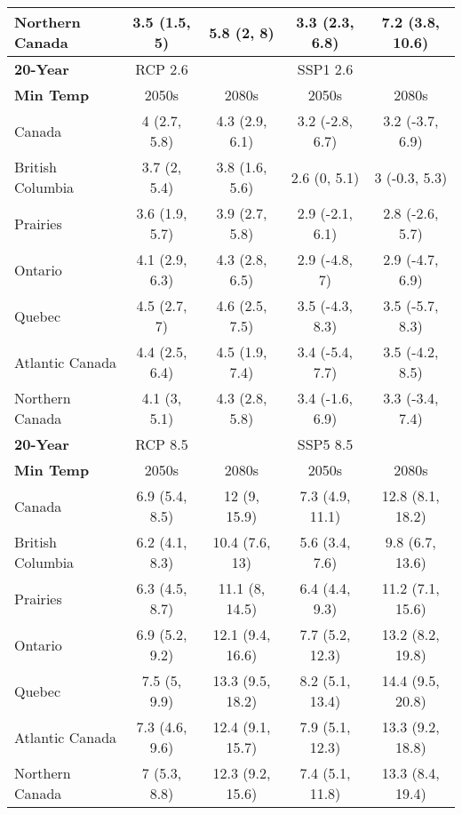 \documentclass[]{scrartcl}
\begin{document}
\begin{table}[t]
\begin{center}
\begin{tabularx}{\linewidth}{|L|cc|cc|}
			Northern Canada & 3.5 (1.5, 5) & 5.8 (2, 8) & 3.3 (2.3, 6.8) & 7.2 (3.8, 10.6) \\ 
			\hline
			\hline
			\textbf{20-Year} & RCP 2.6 & & SSP1 2.6 &   \\
			\textbf{Min Temp} & 2050s & 2080s & 2050s &2080s \\
			\hline
			Canada & 4 (2.7, 5.8) & 4.3 (2.9, 6.1) & 3.2 (-2.8, 6.7) & 3.2 (-3.7, 6.9) \\ 
			British Columbia & 3.7 (2, 5.4) & 3.8 (1.6, 5.6) & 2.6 (0, 5.1) & 3 (-0.3, 5.3) \\ 
			Prairies & 3.6 (1.9, 5.7) & 3.9 (2.7, 5.8) & 2.9 (-2.1, 6.1) & 2.8 (-2.6, 5.7) \\ 
			Ontario & 4.1 (2.9, 6.3) & 4.3 (2.8, 6.5) & 2.9 (-4.8, 7) & 2.9 (-4.7, 6.9) \\ 
			Quebec & 4.5 (2.7, 7) & 4.6 (2.5, 7.5) & 3.5 (-4.3, 8.3) & 3.5 (-5.7, 8.3) \\ 
			Atlantic Canada & 4.4 (2.5, 6.4) & 4.5 (1.9, 7.4) & 3.4 (-5.4, 7.7) & 3.5 (-4.2, 8.5) \\ 
			Northern Canada & 4.1 (3, 5.1) & 4.3 (2.8, 5.8) & 3.4 (-1.6, 6.9) & 3.3 (-3.4, 7.4) \\ 
			\hline
			\textbf{20-Year} & RCP 8.5 & & SSP5 8.5 &   \\
			\textbf{Min Temp} & 2050s & 2080s & 2050s &2080s \\
			\hline
			Canada & 6.9 (5.4, 8.5) & 12 (9, 15.9) & 7.3 (4.9, 11.1) & 12.8 (8.1, 18.2) \\ 
			British Columbia & 6.2 (4.1, 8.3) & 10.4 (7.6, 13) & 5.6 (3.4, 7.6) & 9.8 (6.7, 13.6) \\ 
			Prairies & 6.3 (4.5, 8.7) & 11.1 (8, 14.5) & 6.4 (4.4, 9.3) & 11.2 (7.1, 15.6) \\ 
			Ontario & 6.9 (5.2, 9.2) & 12.1 (9.4, 16.6) & 7.7 (5.2, 12.3) & 13.2 (8.2, 19.8) \\ 
			Quebec & 7.5 (5, 9.9) & 13.3 (9.5, 18.2) & 8.2 (5.1, 13.4) & 14.4 (9.5, 20.8) \\ 
			Atlantic Canada & 7.3 (4.6, 9.6) & 12.4 (9.1, 15.7) & 7.9 (5.1, 12.3) & 13.3 (9.2, 18.8) \\ 
			Northern Canada & 7 (5.3, 8.8) & 12.3 (9.2, 15.6) & 7.4 (5.1, 11.8) & 13.3 (8.4, 19.4) \\ 
			\hline	
		\end{tabularx}
	\end{center}
\end{table}

\end{document}
